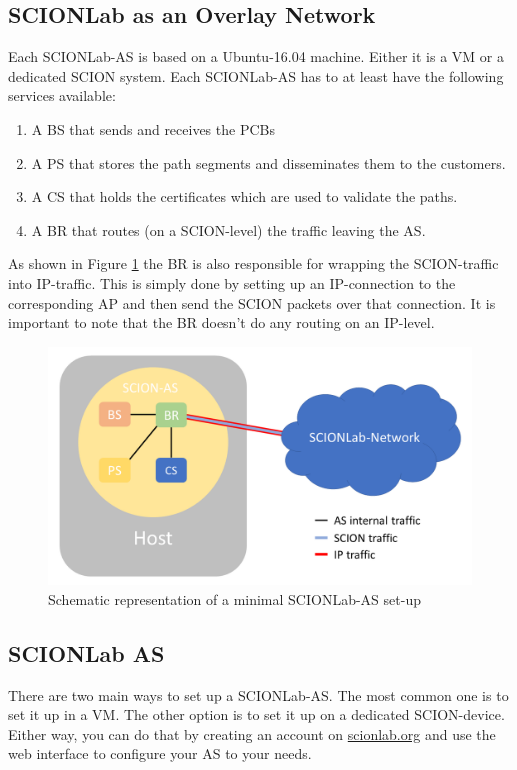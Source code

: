 \subsection{SCIONLab as an Overlay Network}
Each \acs{SCIONLab}-\acs{AS} is based on a Ubuntu-16.04 machine. Either it is a \acl{VM} or a dedicated \acs{SCION} system. Each \acs{SCIONLab}-\acs{AS} has to at least have the following services available: 
\\
\begin{enumerate}
\item A \acl{BS} that sends and receives the \acsp{PCB}
\item A \acl{PS} that stores the path segments and disseminates them to the customers.
\item A \acl{CS} that holds the certificates which are used to validate the paths.
\item A \acl{BR} that routes (on a \acs{SCION}-level) the traffic leaving the \acs{AS}.
\end{enumerate}

As shown in Figure \ref{SCIONLab-AS} the \acl{BR} is also responsible for wrapping the \acs{SCION}-traffic into \acs{IP}-traffic. This is simply done by setting up an \acs{IP}-connection to the corresponding \acl{AP} and then send the \acs{SCION} packets over that connection. It is important to note that the \acl{BR} doesn't do any routing on an \acs{IP}-level.

\begin{figure}[h]
	\centering
	\includegraphics[width=\textwidth]{img/SCIONLab-AS.png}
	\caption{Schematic representation of a minimal SCIONLab-AS set-up}
	\label{SCIONLab-AS}
\end{figure}

\subsection{SCIONLab AS}
There are two main ways to set up a \acs{SCIONLab}-\acs{AS}. The most common one is to set it up in a \acs{VM}. The other option is to set it up on a dedicated \acs{SCION}-device. Either way, you can do that by creating an account on \href{https://www.scionlab.org}{scionlab.org} and use the web interface to configure your \acs{AS} to your needs.

